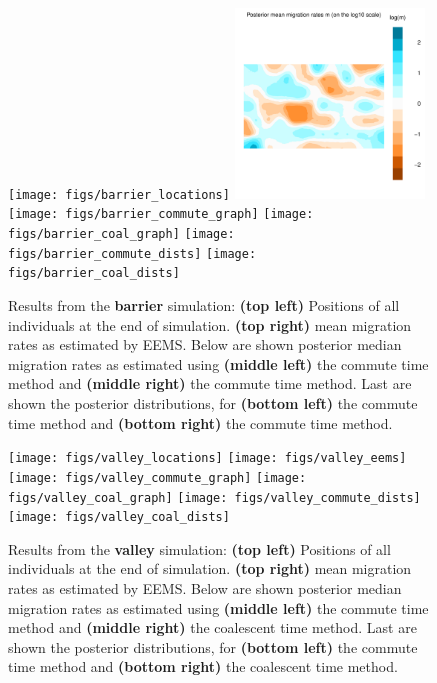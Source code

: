\documentclass{article}
\begin{document}
\begin{figure}
\centering
    \texttt{[image: figs/barrier\_locations]}
    \includegraphics[width=0.45\textwidth]{figs/barrier_eems}
    \texttt{[image: figs/barrier\_commute\_graph]}
    \texttt{[image: figs/barrier\_coal\_graph]}
    \texttt{[image: figs/barrier\_commute\_dists]}
    \texttt{[image: figs/barrier\_coal\_dists]}
    \caption{
        Results from the \textbf{barrier} simulation:
        \textbf{(top left)} Positions of all individuals at the end of simulation.
        \textbf{(top right)} mean migration rates as estimated by EEMS.
        Below are shown
        posterior median migration rates 
            as estimated using 
            \textbf{(middle left)} the commute time method and
            \textbf{(middle right)} the commute time method.
        Last are shown the posterior distributions, for
            \textbf{(bottom left)} the commute time method and
            \textbf{(bottom right)} the commute time method.
        \label{sfig:barrier_results}
    }
\end{figure}

\begin{figure}
\centering
    \texttt{[image: figs/valley\_locations]}
    \texttt{[image: figs/valley\_eems]}
    \texttt{[image: figs/valley\_commute\_graph]}
    \texttt{[image: figs/valley\_coal\_graph]}
    \texttt{[image: figs/valley\_commute\_dists]}
    \texttt{[image: figs/valley\_coal\_dists]}
    \caption{
        Results from the \textbf{valley} simulation:
        \textbf{(top left)} Positions of all individuals at the end of simulation.
        \textbf{(top right)} mean migration rates as estimated by EEMS.
        Below are shown
        posterior median migration rates 
            as estimated using 
            \textbf{(middle left)} the commute time method and
            \textbf{(middle right)} the coalescent time method.
        Last are shown the posterior distributions, for
            \textbf{(bottom left)} the commute time method and
            \textbf{(bottom right)} the coalescent time method.
        \label{sfig:valley_results}
    }
\end{figure}
\end{document}
